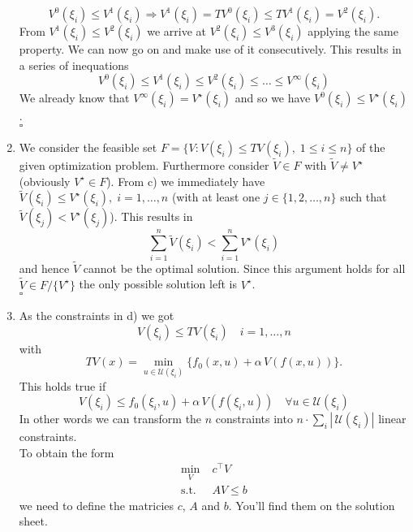 \documentclass[12pt,pdftex,a4paper]{scrartcl}
\begin{document}
\begin{enumerate}
	\begin{equation*}
		V^0(\xi_i) \le V^1(\xi_i) \Rightarrow V^1(\xi_i) = TV^0(\xi_i) \le TV^1(\xi_i) = V^2(\xi_i).
	\end{equation*}
	From $V^1(\xi_i) \le V^2(\xi_i)$ we arrive at $V^2(\xi_i) \le V^3(\xi_i)$ applying the same property. We can now go on and make use of it consecutively. This results in a series of inequations
	\begin{equation*}
		V^0(\xi_i) \le V^1(\xi_i) \le V^2(\xi_i) \le \ldots \le V^\infty(\xi_i)
	\end{equation*}
	We already know that $V^\infty(\xi_i) = V^\star(\xi_i)$ and so we have $V^0(\xi_i) \le V^\star(\xi_i)$.\\
	\hspace*{133mm}$\square$
	
	\item We consider the feasible set $F = \{V : V(\xi_i) \le TV(\xi_i), \; 1\le i \le n\}$ of the given optimization problem. Furthermore consider $\tilde{V}\in F$ with $\tilde{V} \neq V^\star$ (obviously $V^\star \in F$). From c) we immediately have $\tilde{V}(\xi_i) \le V^\star(\xi_i), \; i = 1,\ldots, n$ (with at least one $j\in\{1,2,\ldots ,n\}$ such that $\tilde{V}(\xi_j) < V^\star(\xi_j)$). This results in
	\begin{equation*}
		\sum_{i=1}^n \tilde{V}(\xi_i) < \sum_{i=1}^n V^\star(\xi_i)
	\end{equation*}
	and hence $\tilde{V}$ cannot be the optimal solution. Since this argument holds for all $\tilde{V} \in F/\{V^\star\}$ the only possible solution left is $V^\star$.\\
	\hspace*{133mm}$\square$
	
	\item As the constraints in d) we got
	\begin{equation*}
		V(\xi_i) \le TV(\xi_i) \quad i = 1,\ldots, n
	\end{equation*}
	with
	\begin{equation*}
		TV(x) = \min_{u\in\mathcal{U}(\xi_i)}\{ f_0(x,u) + \alpha\,V(f(x,u))\}.
	\end{equation*}
	This holds true if
	\begin{equation*}
		V(\xi_i) \le  f_0(\xi_i,u) + \alpha\,V(f(\xi_i,u))\quad \forall u\in\mathcal{U}(\xi_i)
	\end{equation*}
	In other words we can transform the $n$ constraints into $n\cdot\sum_i |\,\mathcal{U}(\xi_i)|$ linear constraints.\\
	To obtain the form
	\begin{equation*}
		\begin{split}
			\min_V \;& c^\top V\\
			\text{s.t.} \;& AV \le b
		\end{split}
	\end{equation*}
	we need to define the matricies $c$, $A$ and $b$. You'll find them on the solution sheet.
	

\end{enumerate}
\end{document}
